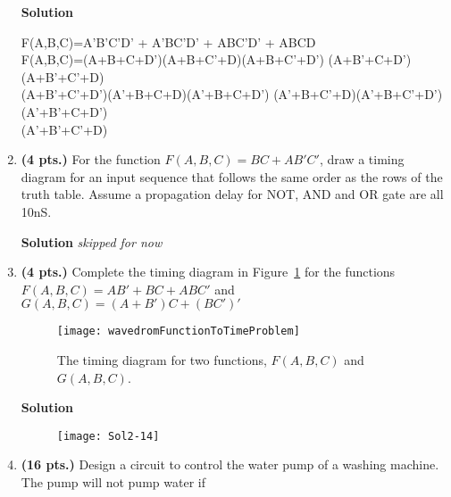 \begin{enumerate}
        \begin{onlysolution}  \textbf{Solution} \itshape

            F(A,B,C)=A'B'C'D' + A'BC'D' + ABC'D' + ABCD  \\
            F(A,B,C)=(A+B+C+D')(A+B+C'+D)(A+B+C'+D') (A+B'+C+D')(A+B'+C'+D) \\
            (A+B'+C'+D')(A'+B+C+D)(A'+B+C+D') (A'+B+C'+D)(A'+B+C'+D')(A'+B'+C+D')\\
            (A'+B'+C'+D)
        \end{onlysolution}

    \item \textbf{ (4 pts.)} For the function $F(A,B,C)= BC+AB'C'$,  draw
        a timing diagram for an input sequence that follows the same order
        as the rows of the truth table.  Assume a propagation delay for NOT,
        AND and OR gate are all 10nS.

        \begin{onlysolution}  \textbf{Solution} \itshape
            skipped for now
        \end{onlysolution}

    \item \textbf{ (4 pts.)} Complete the timing diagram in Figure~\ref{fig:HWtime}
        for the functions
        $F(A,B,C) = AB' + BC + ABC'$ and $G(A,B,C) = (A+B')C + (BC')'$
        \begin{figure}[ht]
            \texttt{[image: wavedromFunctionToTimeProblem]}
            \caption{The timing diagram for two functions, $F(A,B,C)$ and $G(A,B,C)$.}
            \label{fig:HWtime}
        \end{figure}

        \begin{onlysolution}  \textbf{Solution} \itshape

            \begin{figure}[ht]
                \texttt{[image: Sol2-14]}
            \end{figure}
        \end{onlysolution}

    \item\textbf{ (16 pts.)} Design a circuit to control
        the water pump of a washing machine.  The pump will not pump
        water if


\end{enumerate}

